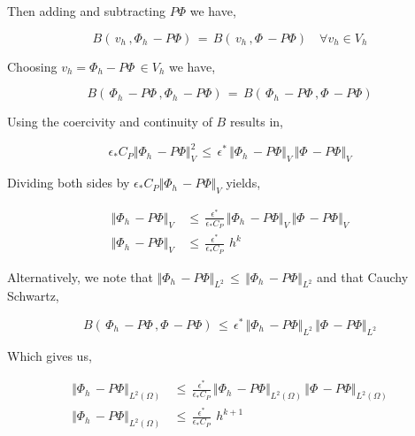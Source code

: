 \documentclass[10pt]{report}
\numberwithin{equation}{section}
\begin{document}
\noindent
Then adding and subtracting $P \Phi$ we have,

\begin{equation}
B\left( \, v_{h} \, , \Phi_{h} \,  - P \Phi \right)  \, = \, B\left( \, v_{h} \, , \Phi \,  - P \Phi \right)    \quad \forall v_{h} \in V_{h}
\end{equation}

\noindent
Choosing $v_{h} = \Phi_{h} - P \Phi \, \in V_{h}$ we have,

\begin{equation}
B\left( \, \Phi_{h} \,  - P \Phi  \, , \Phi_{h} \,  - P \Phi \right)  \, = \, B\left( \, \Phi_{h} \,  - P \Phi \, , \Phi \,  - P \Phi \right)   
\end{equation}

\noindent
Using the coercivity and continuity of $B$ results in,

\begin{equation}
\epsilon_{*} C_{P} \Vert \Phi_{h} \,  - P \Phi  \Vert^{2}_{V} \, \leq \, \epsilon^{*} \, \Vert \Phi_{h} \,  - P \Phi  \Vert_{V}  \, \Vert \Phi \,  - P \Phi  \Vert_{V} 
\end{equation}

\noindent
Dividing both sides by $\epsilon_{*} C_{P} \Vert \Phi_{h} \,  - P \Phi  \Vert_{V}$ yields,

\begin{align}
\Vert \Phi_{h} \,  - P \Phi  \Vert_{V} \, &\leq \, \frac{\epsilon^{*}}{\epsilon_{*} C_{P} } \, \Vert \Phi_{h} \,  - P \Phi  \Vert_{V}  \, \Vert \Phi \,  - P \Phi  \Vert_{V}  \\
\Vert \Phi_{h} \,  - P \Phi  \Vert_{V} \,  &\leq \, \frac{\epsilon^{*}}{\epsilon_{*} C_{P} } \, \
h^{k}
\end{align}

Alternatively, we note that $\Vert \Phi_{h} \,  - P \Phi  \Vert_{L^{2}} \, \leq \, \Vert \Phi_{h} \,  - P \Phi  \Vert_{L^{2}} $  and that Cauchy Schwartz,

$$B\left( \, \Phi_{h} \,  - P \Phi \, , \Phi \,  - P \Phi \right)  \,
\leq \, \epsilon^{*} \, \Vert \Phi_{h} \,  - P \Phi  \Vert_{L^2}  \, \Vert \Phi \,  - P \Phi  \Vert_{L^2} $$

\noindent
Which gives us,

\begin{align}
\Vert \Phi_{h} \,  - P \Phi  \Vert_{L^{2}(\Omega)} \, &\leq \, \frac{\epsilon^{*}}{\epsilon_{*} C_{P} } \, \Vert \Phi_{h} \,  - P \Phi  \Vert_{L^{2}(\Omega)}  \, \Vert \Phi \,  - P \Phi  \Vert_{L^{2}(\Omega)}  \\
\Vert \Phi_{h} \,  - P \Phi  \Vert_{L^{2}(\Omega)} \,  &\leq \, \frac{\epsilon^{*}}{\epsilon_{*} C_{P} } \, \
h^{k+1}
\end{align}
\end{document}
